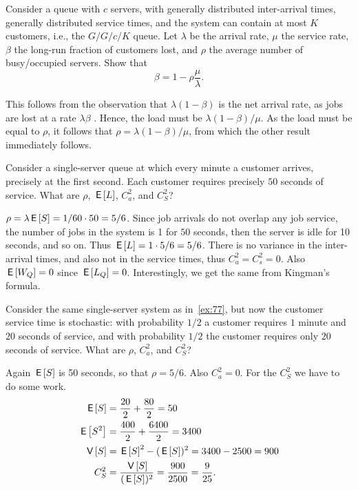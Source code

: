 \begin{exercise}
 Consider a queue with $c$ servers, with generally distributed inter-arrival times, generally distributed service times, and the system can contain at most $K$ customers, i.e., the $G/G/c/K$ queue.
 Let $\lambda$ be the arrival rate, $\mu$ the service rate, $\beta$ the long-run fraction of customers lost, and $\rho$ the average number of busy/occupied servers.
 Show that
 \begin{equation*}
 \beta = 1 - \rho\frac{\mu}{\lambda}.
 \end{equation*}
\begin{solution}
 This follows from the observation that $\lambda(1-\beta)$ is the net
 arrival rate, as jobs are lost at a rate $\lambda\beta$ . Hence, the
 load must be $\lambda(1-\beta)/\mu$. As the load must be equal to
 $\rho$, it follows that $\rho = \lambda(1-\beta)/\mu$, from which the
 other result immediately follows.
\end{solution}
\end{exercise}

\begin{extra}
 Consider a single-server queue at which every minute a customer arrives, precisely at the first second.
 Each customer requires precisely $50$ seconds of service.
 What are $\rho$, $\,\mathsf{E}\left[L\right]$, $C_a^2$, and $C_S^2$?
\begin{solution}
 $\rho = \lambda \,\mathsf{E}\left[S\right] = 1/60 \cdot 50 = 5/6$.
 Since job arrivals do not overlap any job service, the number of jobs in the system is 1 for $50$ seconds, then the server is idle for 10 seconds, and so on.
 Thus $\,\mathsf{E}\left[L\right] = 1\cdot5/6 = 5/6$.
 There is no variance in the inter-arrival times, and also not in the service times, thus $C_a^2 = C_s^2 = 0$.
 Also $\,\mathsf{E}\left[W_Q\right]=0$ since $\,\mathsf{E}\left[L_Q\right]=0$.
 Interestingly, we get the same from Kingman's formula.
\end{solution}
\end{extra}

\begin{exercise}
 Consider the same single-server system as in~\cref{ex:77}, but now the customer service time is stochastic: with probability $1/2$ a customer requires $1$ minute and $20$ seconds of service, and with probability $1/2$ the customer requires only $20$ seconds of service.
 What are $\rho$, $C_a^2$, and $C_S^2$?
\begin{solution}
 Again $\,\mathsf{E}\left[S\right]$ is 50 seconds, so that $\rho = 5/6$. Also
 $C_a^2=0$. For the $C_S^2$ we have to do some work. 
 \begin{equation*}
 \begin{split}
 \,\mathsf{E}\left[S\right] &= \frac{20}2 + \frac{80}2 = 50 \\
 \,\mathsf{E}\left[S^2\right] &= \frac{400}2 + \frac{6400} 2 = 3400 \\
 \,\mathsf{V}\left[S\right] &= \,\mathsf{E}\left[S\right]^2 - (\,\mathsf{E}\left[S\right])^2 = 3400 - 2500 = 900 \\
 C_S^2 &= \frac{\,\mathsf{V}\left[S\right]}{(\,\mathsf{E}\left[S\right])^2} = \frac{900}{2500}=\frac{9}{25}.
 \end{split}
 \end{equation*}
\end{solution}
\end{exercise}

